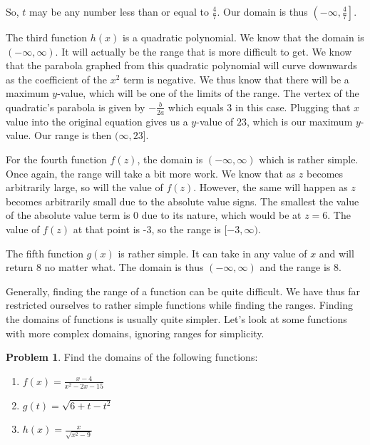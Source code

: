 \documentclass[12pt]{article}
\theoremstyle{definition}
\newtheorem{problem}{Problem}
\begin{document}
                So, $t$ may be any number less than or equal to $\frac{4}{7}$.
                Our domain is thus $\left(-\infty, \frac{4}{7}\right]$.

The third function $h(x)$ is a quadratic polynomial.
We know that the domain is $(-\infty, \infty)$.
It will actually be the range that is more difficult to get.
We know that the parabola graphed from this quadratic polynomial will curve downwards as the coefficient of the $x^2$ term is negative.
We thus know that there will be a maximum $y$-value, which will be one of the limits of the range.
The vertex of the quadratic's parabola is given by $-\frac{b}{2a}$ which equals $3$ in this case.
Plugging that $x$ value into the original equation gives us a $y$-value of $23$, which is our maximum $y$-value.
Our range is then $(\infty, 23]$.

For the fourth function $f(z)$, the domain is $(-\infty , \infty)$ which is rather simple.
Once again, the range will take a bit more work.
We know that as $z$ becomes arbitrarily large, so will the value of $f(z)$.
However, the same will happen as $z$ becomes arbitrarily small due to the absolute value signs.
The smallest the value of the absolute value term is 0 due to its nature, which would be at $z=6$.
The value of $f(z)$ at that point is -3, so the range is $[-3, \infty)$.

The fifth function $g(x)$ is rather simple.
It can take in any value of $x$ and will return $8$ no matter what.
The domain is thus $(-\infty , \infty)$ and the range is $8$.

Generally, finding the range of a function can be quite difficult.
We have thus far restricted ourselves to rather simple functions while finding the ranges.
Finding the domains of functions is usually quite simpler.
Let's look at some functions with more complex domains, ignoring ranges for simplicity.

\begin{problem}
Find the domains of the following functions:

\begin{enumerate}
    \item $f(x) = \displaystyle \frac{{x - 4}}{{{x^2} - 2x - 15}}$
    \item $g(t) = \sqrt {6 + t - {t^2}}$
    \item $h(x) = \displaystyle \frac{x}{{\sqrt {{x^2} - 9} }}$
\end{enumerate}
\end{problem}
\end{document}
